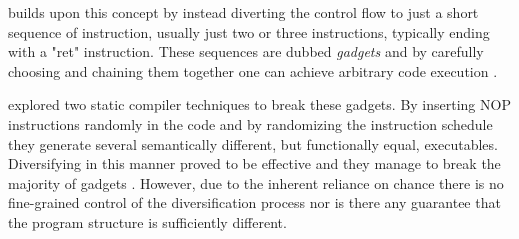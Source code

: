 \textcite{rop} builds upon this concept by instead diverting the control flow to just a short
sequence of instruction, usually just two or three instructions, typically ending with a
"ret" instruction. These sequences are dubbed \textit{gadgets} and by carefully choosing
and chaining them together one can achieve arbitrary code execution \cite{rop}.

\textcite{large-scale-automated} explored two static compiler techniques to break these
gadgets. By inserting NOP instructions randomly in the code and by randomizing the
instruction schedule they generate several semantically different, but functionally equal,
executables. Diversifying in this manner proved to be effective and they manage to break
the majority of gadgets \cite{large-scale-automated}. However, due to the inherent reliance
on chance there is no fine-grained control of the diversification process nor is there
any guarantee that the program structure is sufficiently different.
